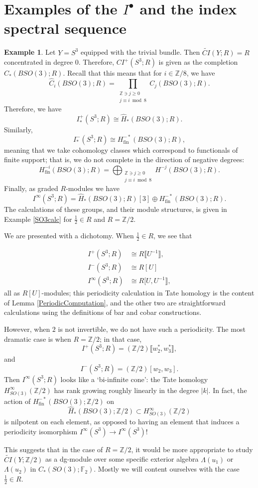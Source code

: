 \documentclass{memo-l}
\theoremstyle{definition}
\newtheorem{example}[theorem]{Example}
\theoremstyle{remark}
\numberwithin{section}{chapter}
\numberwithin{equation}{chapter}
\begin{document}
\section{Examples of the $I^\bullet$ and the index spectral sequence}\label{examples}
\begin{example}Let $Y = S^3$ equipped with the trivial bundle. Then $\widetilde{CI}(Y;R) = R$ concentrated in degree $0$. Therefore, $CI^+(S^3;R)$ is given as the completion $\hat C_*(BSO(3);R)$. Recall that this means that for $i \in \mathbb Z/8$, we have $$\hat C_i(BSO(3);R) = \prod_{\substack{\mathbb Z \ni j \geq 0\\ j \equiv i \bmod 8}} C_j(BSO(3);R).$$ 
Therefore, we have
$$I^+_*(S^3;R) \cong \hat H_*(BSO(3);R).$$ 
Similarly, 
$$I^-_*(S^3;R) \cong H^{-*}_{\text{fin}}(BSO(3);R),$$ 
meaning that we take cohomology classes which correspond to functionals of finite support; that is, we do not complete in the direction of negative degrees:
$$H^{-i}_{\text{fin}}(BSO(3);R) = \bigoplus_{\substack{\mathbb Z \ni j \geq 0\\ j \equiv i \bmod 8}} H^{-j}(BSO(3);R).$$
Finally, as graded $R$-modules we have
$$I^\infty(S^3;R) = \hat H_*(BSO(3);R)[3] \oplus H^{-*}_{\text{fin}}(BSO(3);R).$$ 
The calculations of these groups, and their module structures, is given in Example \ref{SO3calc} for $\frac 12 \in R$ and $R = \mathbb Z/2$.

We are presented with a dichotomy. When $\frac 12 \in R$, we see that

\begin{align*}
I^+(S^3;R) &\cong R\llbracket U^{-1}\rrbracket, \\
I^-(S^3;R) &\cong R[U]\\
I^\infty(S^3;R) &\cong R[U, U^{-1}\rrbracket,
\end{align*} all as $R[U]$-modules; this periodicity calculation in Tate homology is the content of Lemma \ref{PeriodicComputation}, and the other two are straightforward calculations using the definitions of bar and cobar constructions.

However, when $2$ is not invertible, we do not have such a periodicity. The most dramatic case is when $R = \mathbb Z/2$; in that case, $$I^+(S^3;R) = (\mathbb Z/2)\llbracket w_2^*, w_3^*\rrbracket,$$ and $$I^-(S^3;R) = (\mathbb Z/2)[w_2, w_3].$$ Then $I^\infty(S^3;R)$ looks like a `bi-infinite cone': the Tate homology $H^\infty_{SO(3)}(\mathbb Z/2)$ has rank growing roughly linearly in the degree $|k|$. In fact, the action of $H^{-*}_{\text{fin}}(BSO(3);\mathbb Z/2)$ on $$\hat H_*(BSO(3);\mathbb Z/2) \subset H^\infty_{SO(3)}(\mathbb Z/2)$$ is nilpotent on each element, as opposed to having an element that induces a periodicity isomorphism $I^\infty(S^3) \to I^\infty(S^3)$!

This suggests that in the case of $R = \mathbb Z/2$, it would be more appropriate to study $\widetilde{CI}(Y;\mathbb Z/2)$ as a dg-module over some specific exterior algebra $\Lambda(u_1)$ or $\Lambda(u_2)$ in $C_*(SO(3);\mathbb F_2)$. Mostly we will content ourselves with the case $\frac 12 \in R$.
\end{example}
\end{document}
